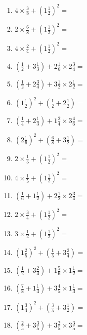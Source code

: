 \documentclass[12pt]{article}
\begin{document}
\begin{enumerate}
\item \large $ 4 \times \frac{3}{8} + (1 \frac{1}{2})^2 = $ \vspace{1.8cm}
\item \large $ 2 \times \frac{6}{8} + (1 \frac{1}{2})^2 = $ \vspace{1.8cm}
\item \large $ 4 \times \frac{2}{4} + (1 \frac{1}{2})^2 = $ \vspace{1.8cm}
\item \large $ (\frac{1}{2} + 3 \frac{1}{3}) + 2 \frac{1}{6} \times 2 \frac{3}{4} = $ \vspace{1.8cm}
\item \large $ (\frac{1}{2} + 2 \frac{3}{4}) + 3 \frac{1}{2} \times 2 \frac{1}{2} = $ \vspace{1.8cm}
\item \large $ (1 \frac{1}{2})^2 + (\frac{1}{2} + 2 \frac{1}{2}) = $ \vspace{1.8cm}
\item \large $ (\frac{1}{4} + 2 \frac{1}{3}) + 1 \frac{2}{4} \times 3 \frac{4}{6} = $ \vspace{1.8cm}
\item \large $ (2 \frac{1}{6})^2 + (\frac{6}{8} + 3 \frac{1}{2}) = $ \vspace{1.8cm}
\newpage
\item \large $ 2 \times \frac{1}{3} + (1 \frac{1}{2})^2 = $ \vspace{1.8cm}
\item \large $ 4 \times \frac{1}{5} + (1 \frac{1}{2})^2 = $ \vspace{1.8cm}
\item \large $ (\frac{1}{6} + 1 \frac{1}{2}) + 2 \frac{1}{2} \times 2 \frac{3}{4} = $ \vspace{1.8cm}
\item \large $ 2 \times \frac{3}{4} + (1 \frac{1}{2})^2 = $ \vspace{1.8cm}
\item \large $ 3 \times \frac{1}{2} + (1 \frac{1}{2})^2 = $ \vspace{1.8cm}
\item \large $ (1 \frac{2}{5})^2 + (\frac{1}{5} + 3 \frac{2}{4}) = $ \vspace{1.8cm}
\item \large $ (\frac{1}{2} + 3 \frac{2}{4}) + 1 \frac{5}{6} \times 1 \frac{1}{2} = $ \vspace{1.8cm}
\item \large $ (\frac{7}{8} + 1 \frac{1}{4}) + 3 \frac{4}{5} \times 1 \frac{1}{3} = $ \vspace{1.8cm}
\item \large $ (1 \frac{3}{4})^2 + (\frac{3}{5} + 3 \frac{1}{2}) = $ \vspace{1.8cm}
\item \large $ (\frac{2}{5} + 3 \frac{3}{5}) + 3 \frac{2}{5} \times 3 \frac{3}{5} = $ \vspace{1.8cm}
\end{enumerate}\newpage
\end{document}
